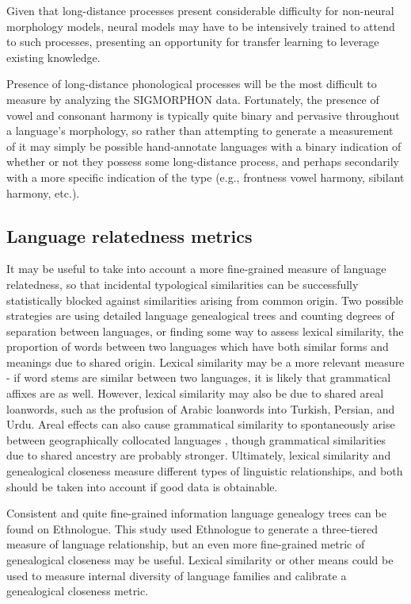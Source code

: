 Given that long-distance processes present considerable difficulty for non-neural morphology models, neural models may have to be intensively trained to attend to such processes, presenting an opportunity for transfer learning to leverage existing knowledge.

Presence of long-distance phonological processes will be the most difficult to measure by analyzing the SIGMORPHON data. Fortunately, the presence of vowel and consonant harmony is typically quite binary and pervasive throughout a language's morphology, so rather than attempting to generate a measurement of it may simply be possible hand-annotate languages with a binary indication of whether or not they possess some long-distance process, and perhaps secondarily with a more specific indication of the type (e.g., frontness vowel harmony, sibilant harmony, etc.).

\subsection{Language relatedness metrics}

It may be useful to take into account a more fine-grained measure of language relatedness, so that incidental typological similarities can be successfully statistically blocked against similarities arising from common origin. Two possible strategies are using detailed language genealogical trees and counting degrees of separation between languages, or finding some way to assess lexical similarity, the proportion of words between two languages which have both similar forms and meanings due to shared origin. Lexical similarity may be a more relevant measure - if word stems are similar between two languages, it is likely that grammatical affixes are as well. However, lexical similarity may also be due to shared areal loanwords, such as the profusion of Arabic loanwords into Turkish, Persian, and Urdu. Areal effects can also cause grammatical similarity to spontaneously arise between geographically collocated languages \parencite{Ponti2018}, though grammatical similarities due to shared ancestry are probably stronger. Ultimately, lexical similarity and genealogical closeness measure different types of linguistic relationships, and both should be taken into account if good data is obtainable.

Consistent and quite fine-grained information language genealogy trees can be found on Ethnologue. This study used Ethnologue to generate a three-tiered measure of language relationship, but an even more fine-grained metric of genealogical closeness may be useful. Lexical similarity or other means could be used to measure internal diversity of language families and calibrate a genealogical closeness metric.

